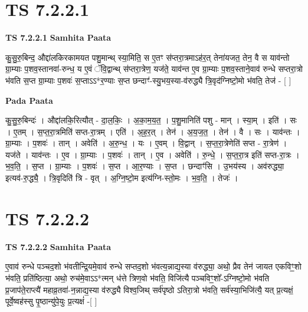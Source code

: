 \documentclass[17pt]{extarticle}
\begin{document}
\section*{ TS 7.2.2.1 }

\textbf{TS 7.2.2.1 } \newline
\textbf{Samhita Paata} \newline

कु॒सु॒रु॒बिन्द॒ औद्दा॑लकिरकामयत पशु॒मान्थ् स्या॒मिति॒ स ए॒तꣳ स॑प्तरा॒त्रमाऽह॑र॒त् तेना॑यजत॒ तेन॒ वै स याव॑न्तो ग्रा॒म्याः प॒शव॒स्तानवा॑-रुन्ध॒ य ए॒वं ॅवि॒द्वान्थ् स॑प्तरा॒त्रेण॒ यज॑ते॒ याव॑न्त ए॒व ग्रा॒म्याः प॒शव॒स्ताने॒वाव॑ रुन्धे सप्तरा॒त्रो भ॑वति स॒प्त ग्रा॒म्याः प॒शवः॑ स॒प्ताऽऽ*र॒ण्याः स॒प्त छन्दाꣳ॑-स्यु॒भय॒स्या-व॑रुद्ध्यै त्रि॒वृद॑ग्निष्टो॒मो भ॑वति॒ तेज॑ - [  ] \newline

\textbf{Pada Paata} \newline

कु॒सु॒रु॒बिन्दः॑ । औद्दा॑लकि॒रित्यौत् - दा॒ल॒किः॒ । अ॒का॒म॒य॒त॒ । प॒शु॒मानिति॑ पशु - मान् । स्या॒म् । इति॑ । सः । ए॒तम् । स॒प्त॒रा॒त्रमिति॑ सप्त-रा॒त्रम् । एति॑ । अ॒ह॒र॒त् । तेन॑ । अ॒य॒ज॒त॒ । तेन॑ । वै । सः । याव॑न्तः । ग्रा॒म्याः । प॒शवः॑ । तान् । अवेति॑ । अ॒रु॒न्ध॒ । यः । ए॒वम् । वि॒द्वान् । स॒प्त॒रा॒त्रेणेति॑ सप्त - रा॒त्रेण॑ । यज॑ते । याव॑न्तः । ए॒व । ग्रा॒म्याः । प॒शवः॑ । तान् । ए॒व । अवेति॑ । रु॒न्धे॒ । स॒प्त॒रा॒त्र इति॑ सप्त-रा॒त्रः । भ॒व॒ति॒ । स॒प्त । ग्रा॒म्याः । प॒शवः॑ । स॒प्त । आ॒र॒ण्याः । स॒प्त । छन्दाꣳ॑सि । उ॒भय॑स्य । अव॑रुद्ध्या॒ इत्यव॑-रु॒द्ध्यै॒ । त्रि॒वृदिति॑ त्रि - वृत् । अ॒ग्नि॒ष्टो॒म इत्य॑ग्नि-स्तो॒मः । भ॒व॒ति॒ । तेजः॑ ।  \newline




\section*{ TS 7.2.2.2 }

\textbf{TS 7.2.2.2 } \newline
\textbf{Samhita Paata} \newline

ए॒वाव॑ रुन्धे पञ्चद॒शो भ॑वतीन्द्रि॒यमे॒वाव॑ रुन्धे सप्तद॒शो भ॑वत्य॒न्नाद्य॒स्या व॑रुद्ध्या॒ अथो॒ प्रैव तेन॑ जायत एकविꣳ॒॒शो भ॑वति॒ प्रति॑ष्ठित्या॒ अथो॒ रुच॑मे॒वाऽऽ*त्मन् ध॑त्ते त्रिण॒वो भ॑वति॒ विजि॑त्यै पञ्चविꣳ॒॒शो᳚-ऽग्निष्टो॒मो भ॑वति प्र॒जाप॑ते॒राप्त्यै॑ महाव्र॒तवा॑-न॒न्नाद्य॒स्या व॑रुद्ध्यै विश्व॒जिथ् सर्व॑पृष्ठो ऽतिरा॒त्रो भ॑वति॒ सर्व॑स्या॒भिजि॑त्यै॒ यत् प्र॒त्यक्षं॒ पूर्वे॒ष्वह॑स्सु पृ॒ष्ठान्यु॑पे॒युः प्र॒त्यक्षं॑ -[  ] \newline
\end{document}
